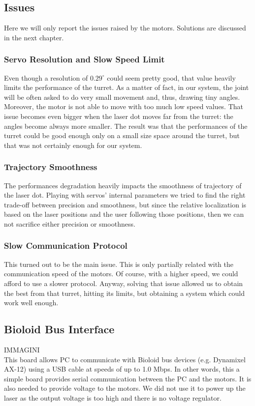 \subsection{Issues}\label{subs:firstModel:issues}
Here we will only report the issues raised by the motors. Solutions are discussed in the next chapter.
\subsubsection{Servo Resolution and Slow Speed Limit}
Even though a resolution of $0.29^{\circ}$ could seem pretty good, that value heavily limits the performance of the turret. As a matter of fact, in our system, the joint will be often asked to do very small movement and, thus, drawing tiny angles. Moreover, the motor is not able to move with too much low speed values. That issue becomes even bigger when the laser dot moves far from the turret: the angles become always more smaller. The result was that the performances of the turret could be good enough only on a small size space around the turret, but that was not certainly enough for our system.
\subsubsection{Trajectory Smoothness}
The performances degradation heavily impacts the smoothness of trajectory of the laser dot. Playing with servos' internal parameters we tried to find the right trade-off between precision and smoothness, but since the relative localization is based on the laser positions and the user following those positions, then we can not sacrifice either precision or smoothness.
\subsubsection{Slow Communication Protocol}
This turned out to be the main issue. This is only partially related with the communication speed of the motors. Of course, with a higher speed, we could afford to use a slower protocol. Anyway, solving that issue allowed us to obtain the best from that turret, hitting its limits, but obtaining a system which could work well enough.

\subsection{Bioloid Bus Interface}
IMMAGINI\\
This board allows PC to communicate with Bioloid bus devices (e.g. Dynamixel AX-12) using a USB cable at speeds of up to 1.0 Mbps. In other words,
this a simple board provides serial communication between the PC and the motors. It is also needed to provide voltage to the motors. We did not use it to power up the laser as the output voltage is too high and there is no voltage regulator.
